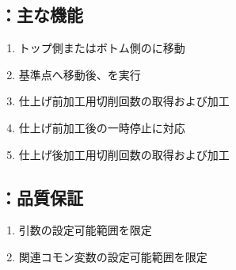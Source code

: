 \clearpage
\subsection{\KOutcutRLeft：主な機能}
\begin{enumerate}[label*=\sarrow]
\item トップ側またはボトム側の\OutcutMillingReferencePoint に移動
\item 基準点へ移動後、\KOLeftFS を実行
\item 仕上げ前加工用切削回数の取得および加工
\item 仕上げ前加工後の一時停止\OpauseCheck に対応
\item 仕上げ後加工用切削回数の取得および加工
\end{enumerate}


\subsection{\KEndFaceRight：品質保証}
\begin{enumerate}[label*=\sarrow]
\item {}引数の設定可能範囲を限定
\item 関連コモン変数の設定可能範囲を限定
\end{enumerate}
